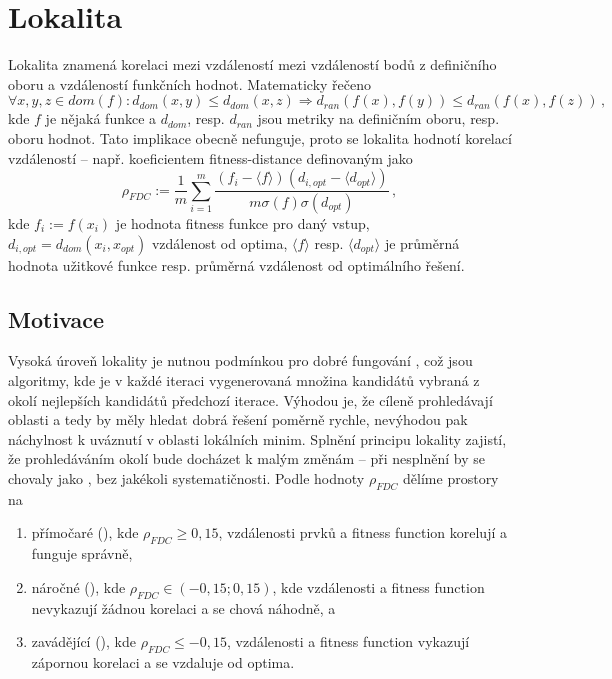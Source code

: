 \chapter{Lokalita}
\label{ch:lokalita}
Lokalita znamená korelaci mezi vzdáleností mezi vzdáleností bodů 
z definičního oboru a vzdáleností funkčních hodnot. Matematicky řečeno
\begin{equation}
	\forall x,y,z \in dom(f): d_{dom} (x,y) \leq d_{dom}(x,z) \Rightarrow d_{ran}(f(x),f(y)) \leq d_{ran}(f(x),f(z))\,,
\end{equation}
kde $f$ je nějaká funkce a $d_{dom}$, resp. $d_{ran}$ jsou metriky na definičním oboru, resp. oboru hodnot. Tato implikace 
obecně nefunguje, proto se lokalita hodnotí korelací vzdáleností -- např. koeficientem fitness-distance definovaným jako
\begin{equation}
	\rho_{FDC} := \frac{1}{m}\sum_{i=1}^{m}\frac{(f_i - \langle f \rangle)(d_{i,opt} - \langle d_{opt} \rangle)}{m \sigma(f) \sigma(d_{opt})}\,,
\end{equation}
kde $f_i := f(x_i)$ je hodnota fitness funkce pro daný vstup, $d_{i, opt} = d_{dom} (x_i, x_{opt})$ vzdálenost od optima, $\langle f \rangle$ resp. $\langle d_{opt}\rangle$ je průměrná hodnota užitkové funkce resp. průměrná vzdálenost od optimálního řešení. 

\section{Motivace}
Vysoká úroveň lokality je nutnou podmínkou pro dobré fungování , což jsou algoritmy, kde je v každé iteraci 
vygenerovaná množina kandidátů vybraná z okolí nejlepších kandidátů předchozí iterace. Výhodou je, že cíleně prohledávají  oblasti a tedy by měly 
hledat dobrá řešení poměrně rychle, nevýhodou 
pak náchylnost k uváznutí v oblasti lokálních minim. Splnění principu lokality zajistí, že prohledáváním okolí bude docházet k malým změnám -- při nesplnění 
by se chovaly jako , bez jakékoli systematičnosti. 
Podle hodnoty $\rho_{FDC}$  dělíme 
prostory na 
\begin{enumerate}
	\item přímočaré (), kde $\rho_{FDC} \geq 0,15$, vzdálenosti prvků a fitness function korelují a  funguje správně,
	\item náročné (), kde $\rho_{FDC} \in (-0,15;0,15)$, kde vzdálenosti a fitness function nevykazují žádnou korelaci a  se chová náhodně, a
	\item zavádějící (), kde $\rho_{FDC} \leq -0,15$, vzdálenosti a fitness function vykazují zápornou korelaci a  se vzdaluje od optima.
\end{enumerate}

